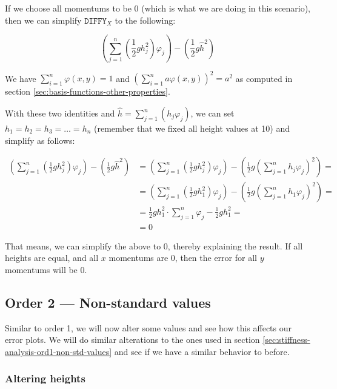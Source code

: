 \documentclass{article}
\renewcommand{\phi}{\varphi}
\begin{document}
If we choose all momentums to be 0 (which is what we are doing in this scenario), then we can simplify $\mathtt{DIFFY}_X$ to the following:

\begin{equation*}
  \left( \sum_{j=1}^n \left(\frac{1}{2} g h_j^2\right) \phi_j \right) - \left( \frac{1}{2} g \widehat{h}^2\right)
\end{equation*}


We have $\sum_{i=1}^n \phi(x,y)=1$ and  $(\sum_{i=1}^n a \phi(x,y))^2 = a^2$ as computed in section \ref{sec:basis-functions-other-properties}.

With these two identities and $\widehat{h}=\sum_{j=1}^n \left(h_j \phi_j\right)$, we can set $h_1=h_2=h_3=\dots=h_n$ (remember that we fixed all height values at 10) and simplify as follows:

\begin{align*}
  \left( \sum_{j=1}^n \left(\frac{1}{2} g h_j^2\right) \phi_j \right) - \left( \frac{1}{2} g \widehat{h}^2\right) &= \left( \sum_{j=1}^n \left(\frac{1}{2} g h_j^2\right) \phi_j \right) - \left( \frac{1}{2} g \left( \sum_{j=1}^n h_j\phi_j \right)^2\right) = \\
  &= \left( \sum_{j=1}^n \left(\frac{1}{2} g h_1^2\right) \phi_j \right) - \left( \frac{1}{2} g \left( \sum_{j=1}^n h_1\phi_j \right)^2\right) = \\
  &= \frac{1}{2} g h_1^2 \cdot \sum_{j=1}^n \phi_j - \frac{1}{2} g h_1^2 = \\
  &= 0
\end{align*}

That means, we can simplify the above to 0, thereby explaining the result. If all heights are equal, and all $x$ momentums are 0, then the error for all $y$ momentums will be 0.

\subsection{Order 2 --- Non-standard values}
\label{sec:stiffness-analysis-ord2-nondefault}

Similar to order 1, we will now alter some values and see how this affects our error plots. We will do similar alterations to the ones used in section \ref{sec:stiffness-analysis-ord1-non-std-values} and see if we have a similar behavior to before.

\subsubsection{Altering heights}
\label{sec:stiffness-analysis-ord2-nondefault-altering-heights}
\end{document}
